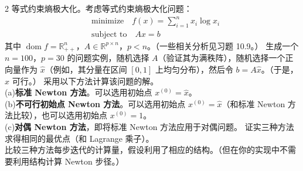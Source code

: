 \documentclass{article}
\newenvironment{problem_cn}[2][问题]{\begin{trivlist}
\item[\hskip \labelsep {\bfseries #1}\hskip \labelsep {\bfseries #2.}]}{\end{trivlist}}
\begin{document}
\vspace{0.25in}
\begin{problem_cn}{2}
等式约束熵极大化。考虑等式约束熵极大化问题：
\[
\begin{aligned}
&\text{minimize} \quad f(x) = \sum_{i=1}^n x_i \log x_i \\
&\text{subject to} \quad Ax = b
\end{aligned}
\]
其中 \(\operatorname{dom} f = \mathbb{R}_{++}^n\)，\(A \in \mathbb{R}^{p \times n}\)，\(p < n\)。（一些相关分析见习题 10.9。）
生成一个 \(n = 100\)，\(p = 30\) 的问题实例，随机选择 \(A\)（验证其为满秩阵），随机选择一个正向量作为 \(\hat{x}\)（例如，其分量在区间 \([0,1]\) 上均匀分布），然后令 \(b = A\hat{x}\)。（于是，\(\hat{x}\) 可行。）
采用以下方法计算该问题的解。\\
(a)\textbf{标准 Newton 方法}。可以选用初始点 \(x^{(0)} = \hat{x}\)。\\
(b)\textbf{不可行初始点 Newton 方法}。可以选用初始点 \(x^{(0)} = \hat{x}\)（和标准 Newton 方法比较），也可以选用初始点 \(x^{(0)} = 1\)。\\
(c)\textbf{对偶 Newton 方法}，即将标准 Newton 方法应用于对偶问题。
证实三种方法求得相同的最优点（和 Lagrange 乘子）。\\比较三种方法每步迭代的计算量，假设利用了相应的结构。（但在你的实现中不需要利用结构计算 Newton 步径。）
\end{problem_cn}
\end{document}
